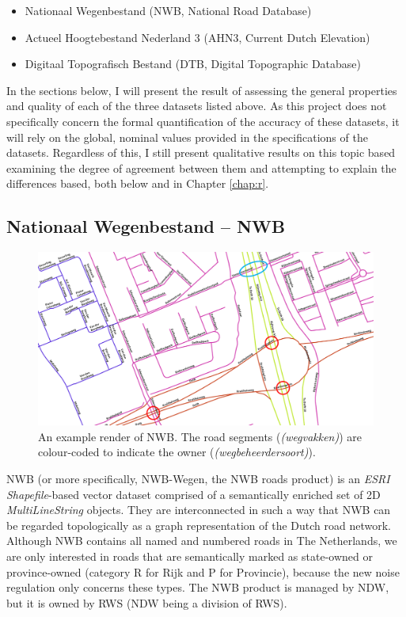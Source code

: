 \begin{itemize}
\item Nationaal Wegenbestand (NWB, National Road Database)
\item Actueel Hoogtebestand Nederland 3 (AHN3, Current Dutch Elevation)
\item Digitaal Topografisch Bestand (DTB, Digital Topographic Database)
\end{itemize}

In the sections below, I will present the result of assessing the general properties and quality of each of the three datasets listed above. As this project does not specifically concern the formal quantification of the accuracy of these datasets, it will rely on the global, nominal values provided in the specifications of the datasets. Regardless of this, I still present qualitative results on this topic based examining the degree of agreement between them and attempting to explain the differences based, both below and in Chapter \ref{chap:r}.

\subsection{Nationaal Wegenbestand – NWB}
\label{sub:nwb}

\begin{figure}[h]
    \centering
    \includegraphics[width=\linewidth]{final_report/figs/nwb_sample_02.png} 
    \caption{An example render of NWB. The road segments (\textit{(wegvakken)}) are colour-coded to indicate the owner (\textit{(wegbeheerdersoort)}).}
    \label{fig:nwb}
\end{figure}

NWB (or more specifically, NWB-Wegen, the NWB roads product) is an \textit{ESRI Shapefile}-based vector dataset comprised of a semantically enriched set of 2D \textit{MultiLineString} objects. They are interconnected in such a way that NWB can be regarded topologically as a graph representation of the Dutch road network. Although NWB contains all named and numbered roads in The Netherlands, we are only interested in roads that are semantically marked as state-owned or province-owned (category R for Rijk and P for Provincie), because the new noise regulation only concerns these types. The NWB product is managed by NDW, but it is owned by RWS (NDW being a division of RWS).

